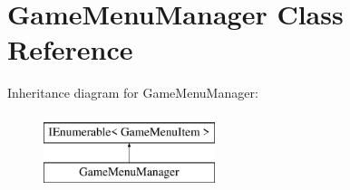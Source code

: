 \hypertarget{class_game_menu_manager}{}\section{Game\+Menu\+Manager Class Reference}
\label{class_game_menu_manager}
Inheritance diagram for Game\+Menu\+Manager\+:\begin{figure}[H]
\begin{center}
\leavevmode
\includegraphics[height=2.000000cm]{class_game_menu_manager}
\end{center}
\end{figure}
